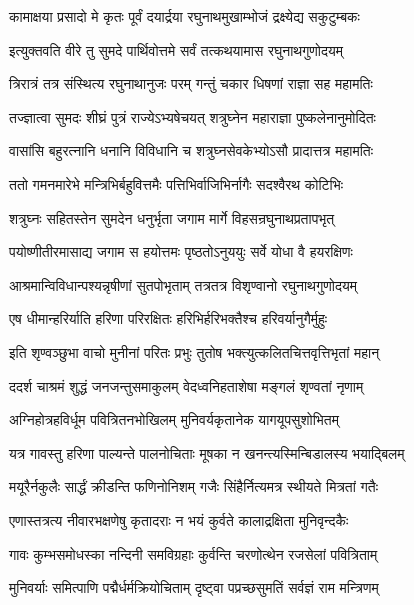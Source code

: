 \twolineshloka
{कामाक्षया प्रसादो मे कृतः पूर्वं दयार्द्रया}
{रघुनाथमुखाम्भोजं द्रक्ष्येद्य सकुटुम्बकः}%

\twolineshloka
{इत्युक्तवति वीरे तु सुमदे पार्थिवोत्तमे}
{सर्वं तत्कथयामास रघुनाथगुणोदयम्}%

\twolineshloka
{त्रिरात्रं तत्र संस्थित्य रघुनाथानुजः परम्}
{गन्तुं चकार धिषणां राज्ञा सह महामतिः}%

\twolineshloka
{तज्ज्ञात्वा सुमदः शीघ्रं पुत्रं राज्येऽभ्यषेचयत्}
{शत्रुघ्नेन महाराज्ञा पुष्कलेनानुमोदितः}%

\twolineshloka
{वासांसि बहुरत्नानि धनानि विविधानि च}
{शत्रुघ्नसेवकेभ्योऽसौ प्रादात्तत्र महामतिः}%

\twolineshloka
{ततो गमनमारेभे मन्त्रिभिर्बहुवित्तमैः}
{पत्तिभिर्वाजिभिर्नागैः सदश्वैरथ कोटिभिः}%

\twolineshloka
{शत्रुघ्नः सहितस्तेन सुमदेन धनुर्भृता}
{जगाम मार्गे विहसन्रघुनाथप्रतापभृत्}%

\twolineshloka
{पयोष्णीतीरमासाद्य जगाम स हयोत्तमः}
{पृष्ठतोऽनुययुः सर्वे योधा वै हयरक्षिणः}%

\twolineshloka
{आश्रमान्विविधान्पश्यन्नृषीणां सुतपोभृताम्}
{तत्रतत्र विशृण्वानो रघुनाथगुणोदयम्}%

\twolineshloka
{एष धीमान्हरिर्याति हरिणा परिरक्षितः}
{हरिभिर्हरिभक्तैश्च हरिवर्यानुगैर्मुहुः}%

\twolineshloka
{इति शृण्वञ्छुभा वाचो मुनीनां परितः प्रभुः}
{तुतोष भक्त्युत्कलितचित्तवृत्तिभृतां महान्}%

\twolineshloka
{ददर्श चाश्रमं शुद्धं जनजन्तुसमाकुलम्}
{वेदध्वनिहताशेषा मङ्गलं शृण्वतां नृणाम्}%

\twolineshloka
{अग्निहोत्रहविर्धूम पवित्रितनभोखिलम्}
{मुनिवर्यकृतानेक यागयूपसुशोभितम्}%

\twolineshloka
{यत्र गावस्तु हरिणा पाल्यन्ते पालनोचिताः}
{मूषका न खनन्त्यस्मिन्बिडालस्य भयाद्बिलम्}%

\twolineshloka
{मयूरैर्नकुलैः सार्द्धं क्रीडन्ति फणिनोनिशम्}
{गजैः सिंहैर्नित्यमत्र स्थीयते मित्रतां गतैः}%

\twolineshloka
{एणास्तत्रत्य नीवारभक्षणेषु कृतादराः}
{न भयं कुर्वते कालाद्रक्षिता मुनिवृन्दकैः}%

\twolineshloka
{गावः कुम्भसमोधस्का नन्दिनी समविग्रहाः}
{कुर्वन्ति चरणोत्थेन रजसेलां पवित्रिताम्}%

\twolineshloka
{मुनिवर्याः समित्पाणि पद्मैर्धर्मक्रियोचिताम्}
{दृष्ट्वा पप्रच्छसुमतिं सर्वज्ञं राम मन्त्रिणम्}%


